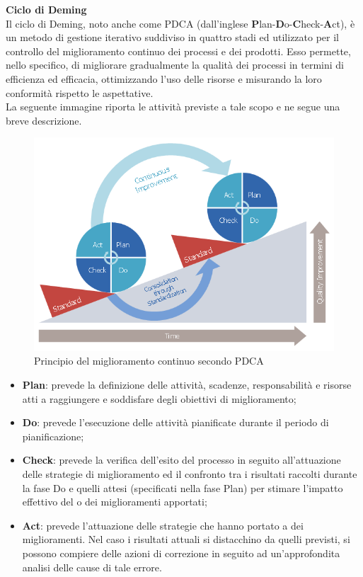 \documentclass[11pt,a4paper]{article}
\begin{document}
{	\textbf{Ciclo di Deming} \\
Il ciclo di Deming, noto anche come PDCA (dall'inglese \textbf{P}lan-\textbf{D}o-\textbf{C}heck-\textbf{A}ct), è un metodo di gestione iterativo suddiviso in quattro stadi ed utilizzato per il controllo del miglioramento continuo dei processi e dei prodotti. Esso permette, nello specifico, di migliorare gradualmente la qualità dei processi in termini di efficienza ed efficacia, ottimizzando l'uso delle risorse e misurando la loro conformità rispetto le aspettative. \\
La seguente immagine riporta le attività previste a tale scopo e ne segue una breve descrizione. 
\begin{figure}[htbp]
	\centering
	\includegraphics[scale=0.5]{images/pdca.png}
	\caption{Principio del miglioramento continuo secondo PDCA}
	
\end{figure}

\begin{itemize}
	\item \textbf{Plan}: prevede la definizione delle attività, scadenze, responsabilità e risorse atti a raggiungere e soddisfare degli obiettivi di miglioramento;
	\item \textbf{Do}: prevede l'esecuzione delle attività pianificate durante il periodo di pianificazione;
	\item \textbf{Check}: prevede la verifica dell'esito del processo in seguito all'attuazione delle strategie di miglioramento ed il confronto tra i risultati raccolti durante la fase Do e quelli attesi (specificati nella fase Plan) per stimare l'impatto effettivo del o dei miglioramenti apportati;
	\item \textbf{Act}: prevede l'attuazione delle strategie che hanno portato a dei miglioramenti. Nel caso i risultati attuali si distacchino da quelli previsti, si possono compiere delle azioni di correzione in seguito ad un'approfondita analisi delle cause di tale errore. 
\end{itemize}
	
}
\end{document}
